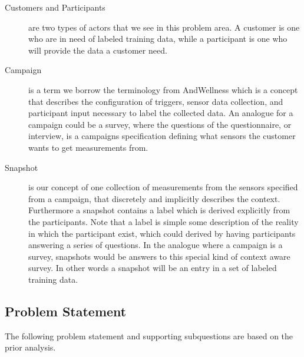 \begin{description}
    \item [Customers and Participants] are two types of actors that we see in this problem area. A customer is one who are in need of labeled training data, while a participant is one who will provide the data a customer need. 
\end{description}

\begin{description}
    \item[Campaign] is a term we borrow the terminology from AndWellness \parencite{hicks2010andwellness} which is a concept that describes  the configuration of triggers, sensor data collection, and participant input necessary to label the collected data. An analogue for a campaign could be a survey, where the questions of the questionnaire, or interview, is a campaigns specification defining what sensors the customer wants to get measurements from. 
\end{description}

\begin{description}
    \item[Snapshot] is our concept of one collection of measurements from the sensors specified from a campaign, that discretely and implicitly describes the context. Furthermore a snapshot contains a label which is derived explicitly from the participants. Note that a label is simple some description of the reality in which the participant exist, which could derived by having participants answering a series of questions. In the analogue where a campaign is a survey, snapshots would be answers to this special kind of context aware survey. In other words a snapshot will be an entry in a set of labeled training data.
\end{description}

\subsection{Problem Statement}
\label{sub:problem_statement}
The following problem statement and supporting subquestions are based on the prior analysis.



